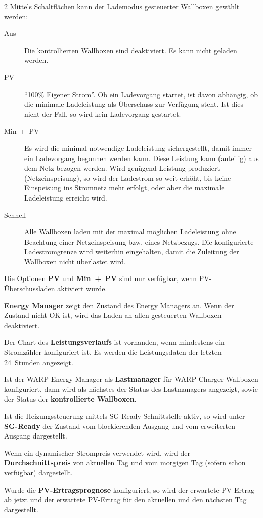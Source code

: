 \documentclass[a4paper,10pt]{article}
\begin{document}
\begin{multicols*}{2}
	Mittels Schaltflächen kann der Lademodus gesteuerter
	Wallboxen gewählt werden:
	\begin{description}
	\item[Aus] Die kontrollierten Wallboxen sind deaktiviert. Es kann
	nicht geladen werden.
	\item[PV] \enquote{100\% Eigener Strom}. Ob ein
	Ladevorgang startet, ist davon abhängig, ob die minimale Ladeleistung
	als Überschuss zur Verfügung steht. Ist dies nicht der Fall, so
	wird kein Ladevorgang gestartet.
	\item[Min~+~PV] Es wird die minimal notwendige Ladeleistung sichergestellt, damit immer ein Ladevorgang begonnen werden kann. Diese Leistung kann (anteilig) aus dem Netz bezogen werden. Wird genügend Leistung produziert (Netzeinspeisung), so wird
	der Ladestrom so weit erhöht, bis keine Einspeisung ins Stromnetz mehr
	erfolgt, oder aber die maximale Ladeleistung erreicht wird.
	\item[Schnell] Alle Wallboxen laden mit der maximal möglichen
	Ladeleistung ohne Beachtung einer Netzeinspeisung bzw. eines Netzbezugs. Die konfigurierte Ladestromgrenze wird weiterhin eingehalten, damit die Zuleitung der Wallboxen nicht überlastet wird.
	\end{description}
	Die Optionen \textbf{PV} und \textbf{Min~+~PV} sind nur verfügbar, wenn PV-Überschussladen aktiviert wurde.

	\textbf{Energy Manager} zeigt den Zustand des Energy Managers an. Wenn der Zustand nicht OK ist, wird das Laden an allen gesteuerten Wallboxen deaktiviert.

	Der Chart des \textbf{Leistungsverlaufs} ist vorhanden, wenn mindestens ein Stromzähler konfiguriert ist.
	Es werden die Leistungsdaten der letzten 24~Stunden angezeigt.

    Ist der WARP Energy Manager als \textbf{Lastmanager} für WARP Charger Wallboxen konfiguriert, dann wird als nächstes der Status des Lastmanagers angezeigt, sowie
	der Status der \textbf{kontrollierte Wallboxen}.

    Ist die Heizungssteuerung mittels SG-Ready-Schnittstelle aktiv, so wird unter \textbf{SG-Ready} der Zustand vom blockierenden Ausgang und vom erweiterten Ausgang dargestellt.

    Wenn ein dynamischer Strompreis verwendet wird, wird der \textbf{Durchschnittspreis} von aktuellen Tag und vom morgigen Tag (sofern schon verfügbar) dargestellt.

    Wurde die \textbf{PV-Ertragsprognose} konfiguriert, so wird der erwartete PV-Ertrag ab jetzt und der erwartete PV-Ertrag für den aktuellen und den nächsten Tag dargestellt.


\end{multicols*}
\end{document}

